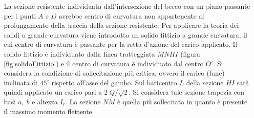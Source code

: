 La sezione resistente individuata dall'intersezione del becco con un piano passante per i punti $A$ e $D$ avrebbe centro di curvatura non appartenente al prolungamento della traccia della sezione resistente. 
Per applicare la teoria dei solidi a grande curvatura viene introdotto un solido fittizio a grande curvatura, il cui centro di curvatura è passante per la retta d'azione del carico applicato. 
Il solido fittizio è individuato dalla linea tratteggiata $MNHI$ (figura \ref{fig:solidoFittizio}) e il centro di curvatura è individuato dal centro $O'$. 
Si considera la condizione di sollecitazione più critica, ovvero il carico (fune) inclinata di $45^\circ$ rispetto all'asse del gambo. 
Sul baricentro $L$ della sezione $HI$ sarà quindi applicato un carico pari a $2 \; Q/\sqrt{2}$. 
Si considera tale sezione trapezia con basi $a, \;b$ e altezza $I_r$.
La sezione $NM$ è quella più sollecitata in quanto è presente il massimo momento flettente.
